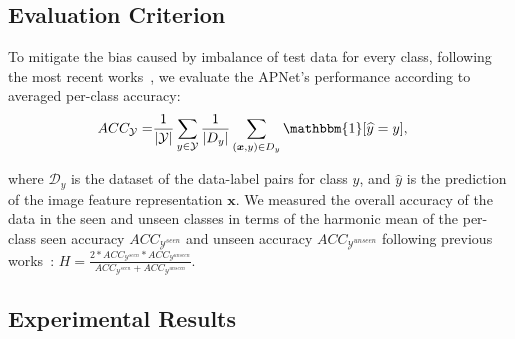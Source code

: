 \documentclass[letterpaper]{article} %
\def\vx{{\bm{x}}}
\begin{document}
\subsection{Evaluation Criterion}
To mitigate the bias caused by imbalance of test data for every class, following the most recent works~\cite{xian2018zero}, we evaluate the APNet's performance according to averaged per-class accuracy:
\begin{align}
 ACC_{\mathcal{Y}}=&\frac{1}{|\mathcal{Y}|}\sum_{y \in \mathcal{Y}}\frac{1}{|D_y|} \sum_{(\vx, y)\in D_y} \mathbbm{1}[\widehat{y}=y],
\end{align}

where $\mathcal{D}_{y}$ is the dataset of the data-label pairs for class $y$, and $\widehat{y}$ is the prediction of the image feature representation $\vx$.
We measured the overall accuracy of the data in the seen and unseen classes in terms of the harmonic mean of the per-class seen accuracy $ACC_{\mathcal{Y}^{seen}}$ and unseen accuracy $ACC_{\mathcal{Y}^{unseen}}$ following previous works~\cite{xian2018zero}:
$H = \frac{2*ACC_{\mathcal{Y}^{seen}}*ACC_{\mathcal{Y}^{unseen}}}{ACC_{\mathcal{Y}^{seen}}+ACC_{\mathcal{Y}^{unseen}}}$.








\subsection{Experimental Results}
\end{document}

